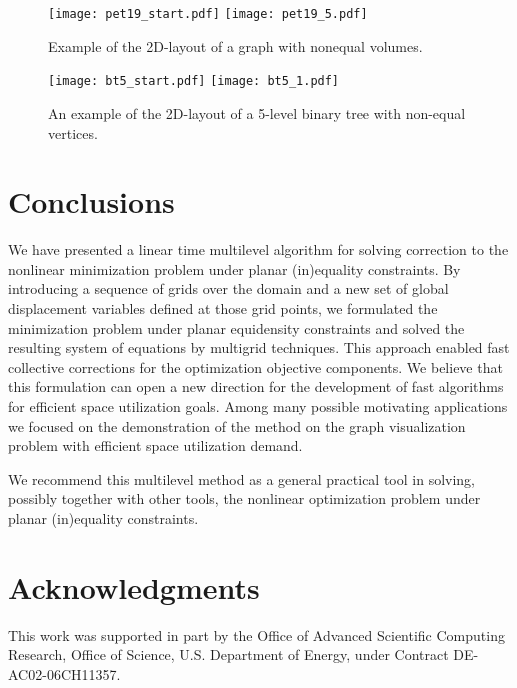 \documentclass[final]{siamltex}
\begin{document}
\begin{figure}
  \centerline{
    \mbox{\texttt{[image: pet19\_start.pdf]}}
    \mbox{\texttt{[image: pet19\_5.pdf]}}
  }
  \caption{Example of the 2D-layout of a graph with nonequal volumes.}
  \label{figvoltest}
\end{figure}
\begin{figure}
  \centerline{
    \mbox{\texttt{[image: bt5\_start.pdf]}}
    \mbox{\texttt{[image: bt5\_1.pdf]}}
  }
  \caption{An example of the 2D-layout of a 5-level binary tree with non-equal vertices.}
  \label{figvoltest-tree}
\end{figure}
\section{Conclusions}\label{future-work}

\par We have presented a linear time multilevel algorithm
for solving correction to the nonlinear minimization problem
under planar (in)equality constraints. By introducing a sequence
of grids over the domain and a new set of global displacement
variables defined at those grid points, we formulated the
minimization problem under planar equidensity constraints and
solved the resulting system of equations by multigrid techniques.
This approach enabled fast collective corrections for the optimization
objective components. We believe that this formulation can open a
new direction for the development of fast algorithms for efficient
space utilization goals. Among many possible motivating
applications
\cite{gd-book,eades1984,harel88,harelinger,dreznerfacility,meguerdichian01coverage,
cardei-energyefficient, citeulike:717044,vlsi2007book} we focused
on the demonstration of the method on the graph visualization
problem with efficient space utilization demand.
\par We recommend this multilevel method as a general practical
tool in solving, possibly together with other tools, the
nonlinear optimization problem under planar (in)equality
constraints.


\section{Acknowledgments}
\par This work was supported in part by the Office of Advanced Scientific Computing Research, Office of Science, U.S. Department of Energy, under Contract DE-AC02-06CH11357.

\end{document}

